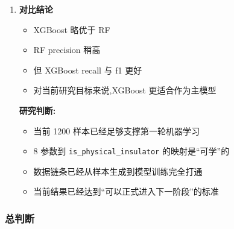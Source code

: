 \documentclass[lang=cn,scheme=chinese,color=blue,device=normal,toc=onecol,math=cm]{elegantbook}
\begin{document}
\begin{enumerate}
\begin{itemize}
\item \texttt{precision = 0.854167}
\item \texttt{recall = 0.953488}
\item \texttt{f1 = 0.901099}
\end{itemize}
 
Class 1:\par
 
\begin{itemize}
\item \texttt{precision = 0.833333}
\item \texttt{recall = 0.588235}
\item \texttt{f1 = 0.689655}
\end{itemize}
\item \textbf{对比结论}\par
 
\begin{itemize}
\item XGBoost 略优于 RF
\item RF precision 稍高
\item 但 XGBoost recall 与 f1 更好
\item 对当前研究目标来说,XGBoost 更适合作为主模型
\end{itemize}
 
\textbf{研究判断:}\par
 
\begin{itemize}
\item 当前 1200 样本已经足够支撑第一轮机器学习
\item 8 参数到 \texttt{is\_\allowbreak{}physical\_\allowbreak{}insulator} 的映射是“可学”的
\item 数据链条已经从样本生成到模型训练完全打通
\item 当前结果已经达到“可以正式进入下一阶段”的标准
\end{itemize}
\end{enumerate}


\subsubsection{总判断}
\end{document}
